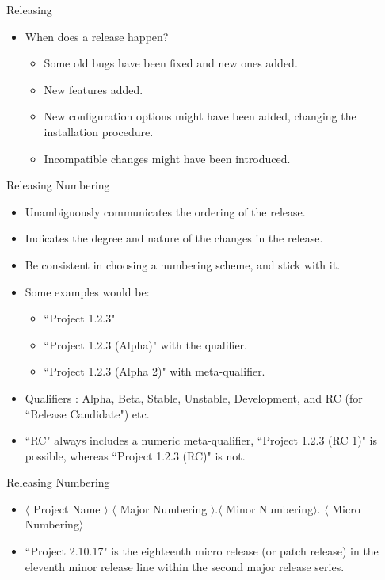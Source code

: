 \documentclass{beamer}
\begin{document}
\begin{frame}{Releasing}
\begin{itemize}
	\item When does a release happen? 
	\begin{itemize}
		\item Some old bugs have been fixed  and new ones added. 
		\item New features added. 
		\item New configuration options might have been added, changing the installation procedure. 
		\item Incompatible changes might have been introduced. 
	\end{itemize}
\end{itemize}
\end{frame}

\begin{frame}{Releasing Numbering}
\begin{itemize}
	\item Unambiguously communicates the ordering of the release. 
	\item Indicates the degree and nature of the changes in the release. 
	\item Be consistent in choosing a numbering scheme, and stick with it. 
	\item Some examples would be:
	\begin{itemize}
		\item ``Project 1.2.3" 
		\item ``Project 1.2.3 (Alpha)" with the qualifier.
		\item ``Project 1.2.3 (Alpha 2)" with meta-qualifier.
	\end{itemize}
	\item Qualifiers : Alpha, Beta, Stable, Unstable, Development, and RC (for ``Release Candidate") etc.
	\item ``RC" always includes a numeric meta-qualifier, ``Project 1.2.3 (RC 1)" is possible, whereas ``Project 1.2.3 (RC)" is not. 		
\end{itemize}
\end{frame}

\begin{frame}{Releasing Numbering}
\begin{itemize}
	\item $\langle$ Project Name $\rangle$ $\langle$ Major Numbering $\rangle$.$\langle$ Minor Numbering$\rangle$. $\langle$ Micro Numbering$\rangle$ 
	\item ``Project 2.10.17" is the eighteenth micro release (or patch release) in the eleventh minor release line within the second major release series. 
\end{itemize}
\end{frame}
\end{document}
